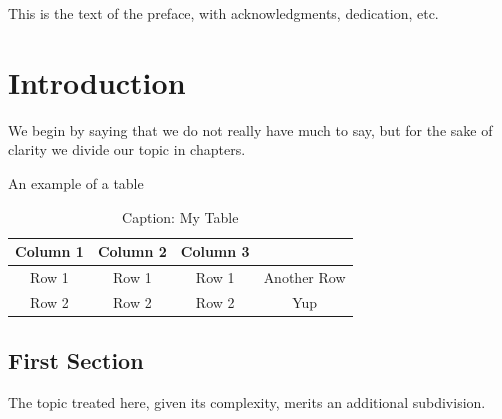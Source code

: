 \documentclass[hidelinks,pdftex,phd]{pittetd}
\begin{document}
\preface



This is the text of the preface, with acknowledgments, dedication, etc. 




\chapter{Introduction}%
We begin by saying that we do not really have much to say, but for the sake of clarity we divide our topic in chapters.

An example of a table
\begin{table}[h]
\centering
\caption{Caption: My Table}
\label{Reference: Title of my Table}
\begin{tabular}{|c|c|c|c|}
\hline
Column 1 & Column 2 & Column 3 &\\ \hline
Row 1 & Row 1 & Row 1 & Another Row\\ \hline
Row 2 & Row 2 & Row 2 & Yup\\ \hline
\end{tabular}
\end{table}

\section{First Section}
The topic treated here, given its complexity, merits an additional subdivision.
\end{document}
